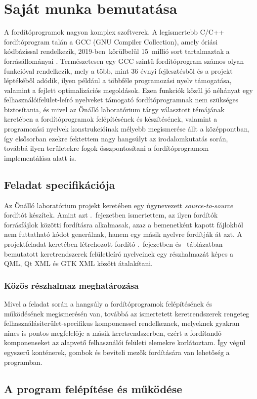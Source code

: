 
\chapter{Saját munka bemutatása}

A fordítóprogramok nagyon komplex szoftverek. A legismertebb C/C++ fordítóprogram talán a GCC (GNU Compiler Collection), amely óriási kódbázissal rendelkezik, 2019-ben~körülbelül 15~millió sort tartalmaztak a forrásállományai \cite{GccWiki}. Természetesen egy GCC szintű fordítóprogram számos olyan funkcióval rendelkezik, mely a több, mint 36 évnyi fejlesztésből és a projekt léptékéből adódik, ilyen például a többféle programozási nyelv támogatása, valamint a fejlett optimalizációs megoldások. Ezen funkciók közül jó néhányat egy felhasználóifelület-leíró nyelveket támogató fordítóprogramnak nem szükséges biztosítania, és mivel az Önálló laboratórium tárgy választott témájának keretében a fordítóprogramok felépítésének és készítésének, valamint a programozási nyelvek konstrukcióinak mélyebb megismerése állt a középpontban, így elsősorban ezekre fektettem nagy hangsúlyt az irodalomkutatás során, továbbá ilyen területekre fogok összpontosítani a fordítóprogramom implementálása alatt is.



\section{Feladat specifikációja}
Az Önálló laboratórium projekt keretében egy úgynevezett \textit{source-to-source} fordítót készítek. Amint azt .~fejezetben ismertettem, az ilyen fordítók forrásfájlok közötti fordításra alkalmasak, azaz a bemenetként kapott fájlokból nem futtatható kódot generálnak, hanem egy másik nyelvre fordítják át azt. A projektfeladat keretében létrehozott fordító .~fejezetben és ~táblázatban bemutatott keretrendszerek felületleíró nyelveinek egy részhalmazát képes a QML, Qt XML és GTK XML között átalakítani.

\subsection{Közös részhalmaz meghatározása}
Mivel a feladat során a hangsúly a fordítóprogramok felépítésének és működésének megismerésén van, továbbá az ismertetett keretrendszerek rengeteg felhasználásiterület-specifikus komponenssel rendelkeznek, melyeknek gyakran nincs is pontos megfelelője a másik keretrendszerben, ezért a fordítandó komponenseket az alapvető felhasználói felületi elemekre korlátoztam. Így végül egyszerű konténerek, gombok és beviteli mezők fordítására van lehetőség a programban.

\section{A program felépítése és működése}




